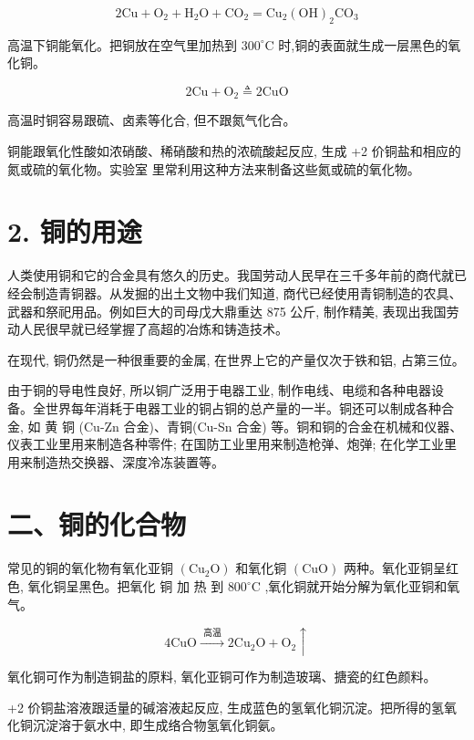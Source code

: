 \documentclass[10pt]{article}
\begin{document}
\[
2\mathrm{{Cu}} + {\mathrm{O}}_{2} + {\mathrm{H}}_{2}\mathrm{O} + {\mathrm{{CO}}}_{2} = {\mathrm{{Cu}}}_{2}{\left( \mathrm{{OH}}\right) }_{2}{\mathrm{{CO}}}_{3}
\]

高温下铜能氧化。把铜放在空气里加热到 \({300}^{ \circ }\mathrm{C}\) 时,铜的表面就生成一层黑色的氧化铜。

\[
2\mathrm{{Cu}} + {\mathrm{O}}_{2} \triangleq 2\mathrm{{CuO}}
\]

高温时铜容易跟硫、卤素等化合, 但不跟氮气化合。

铜能跟氧化性酸如浓硝酸、稀硝酸和热的浓硫酸起反应, 生成 +2 价铜盐和相应的氮或硫的氧化物。实验室 里常利用这种方法来制备这些氮或硫的氧化物。

\section*{2. 铜的用途}

人类使用铜和它的合金具有悠久的历史。我国劳动人民早在三千多年前的商代就已经会制造青铜器。从发掘的出土文物中我们知道, 商代已经使用青铜制造的农具、武器和祭祀用品。例如巨大的司母戊大鼎重达 875 公斤, 制作精美, 表现出我国劳动人民很早就已经掌握了高超的冶炼和铸造技术。

在现代, 铜仍然是一种很重要的金属, 在世界上它的产量仅次于铁和铝, 占第三位。

由于铜的导电性良好, 所以铜广泛用于电器工业, 制作电线、电缆和各种电器设备。全世界每年消耗于电器工业的铜占铜的总产量的一半。铜还可以制成各种合金, 如 黄 铜 (Cu-Zn 合金)、青铜(Cu-Sn 合金) 等。铜和铜的合金在机械和仪器、仪表工业里用来制造各种零件; 在国防工业里用来制造枪弹、炮弹; 在化学工业里用来制造热交换器、深度冷冻装置等。

\section*{二、铜的化合物}

常见的铜的氧化物有氧化亚铜 \(\left( {{\mathrm{{Cu}}}_{2}\mathrm{O}}\right)\) 和氧化铜 \(\left( \mathrm{{CuO}}\right)\) 两种。氧化亚铜呈红色, 氧化铜呈黑色。把氧化 铜 加 热 到 \({800}^{ \circ }\mathrm{C}\) ,氧化铜就开始分解为氧化亚铜和氧气。

\[
4\mathrm{{CuO}}\xrightarrow[]{\text{ 高温 }}2{\mathrm{{Cu}}}_{2}\mathrm{O} + {\mathrm{O}}_{2} \uparrow
\]

氧化铜可作为制造铜盐的原料, 氧化亚铜可作为制造玻璃、搪瓷的红色颜料。

+2 价铜盐溶液跟适量的碱溶液起反应, 生成蓝色的氢氧化铜沉淀。把所得的氢氧化铜沉淀溶于氨水中, 即生成络合物氢氧化铜氨。
\end{document}
